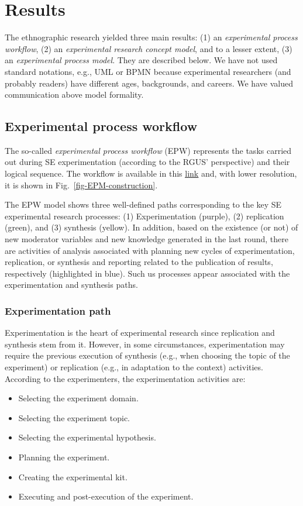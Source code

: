 \section{Results}\label{sec-results}
The ethnographic research yielded three main results: (1) an \textit{experimental process workflow}, (2) an \textit{experimental research concept model}, and to a lesser extent, (3) an \textit{experimental process model}. They are described below. We have not used standard notations, e.g., UML or BPMN because experimental researchers (and probably readers) have different ages, backgrounds, and careers. We have valued communication above model formality.

\subsection{Experimental process workflow}

The so-called \textit{experimental process workflow} (EPW) represents the tasks carried out during SE experimentation (according to the RGUS' perspective) and their logical sequence. The workflow is available in this \href{https://zenodo.org/record/7102486#.YyuKruzMLUI}{\ul{link}} and, with lower resolution, it is shown in Fig.~\ref{fig-EPM-construction}.

The EPW model shows three well-defined paths corresponding to the key SE experimental research processes: (1) Experimentation (purple), (2) replication (green), and (3) synthesis (yellow). In addition, based on the existence (or not) of new moderator variables and new knowledge generated in the last round, there are activities of analysis associated with planning new cycles of experimentation, replication, or synthesis and reporting related to the publication of results, respectively (highlighted in blue). Such us processes appear associated with the experimentation and synthesis paths.

\subsubsection{Experimentation path}
Experimentation is the heart of experimental research since replication and synthesis stem from it. However, in some circumstances, experimentation may require the previous execution of synthesis (e.g., when choosing the topic of the experiment) or replication (e.g., in adaptation to the context) activities. According to the experimenters, the experimentation activities are:
\begin{itemize}
	\item Selecting the experiment domain.
	\item Selecting the experiment topic.
	\item Selecting the experimental hypothesis.
	\item Planning the experiment.
	\item Creating the experimental kit.
	\item Executing and post-execution of the experiment.
\end{itemize}

